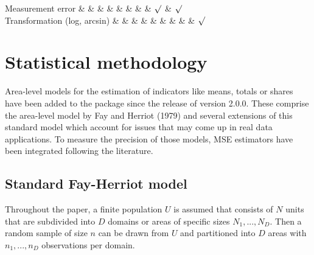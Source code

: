 Measurement error \& \& \& \& \& \& \& \& \(\surd\) \& \(\surd\)\\

Transformation (log, arcsin) \& \& \& \& \& \& \& \& \& \(\surd\)\\

\hypertarget{sec:models}{%
\section{Statistical methodology}\label{sec:models}}

Area-level models for the estimation of indicators like means, totals or
shares have been added to the package since the release of version
2.0.0. These comprise the area-level model by Fay and Herriot (1979) and several
extensions of this standard model which account for issues that may come
up in real data applications. To measure the precision of those models,
MSE estimators have been integrated following the literature.

\hypertarget{subsec:stdfh}{%
\subsection{Standard Fay-Herriot model}\label{subsec:stdfh}}

Throughout the paper, a finite population \(U\) is assumed that consists
of \(N\) units that are subdivided into \(D\) domains or areas of specific
sizes \(N_1,...,N_D\). Then a random sample of size \(n\) can be drawn from
\(U\) and partitioned into \(D\) areas with \(n_1, ..., n_D\) observations per
domain.

